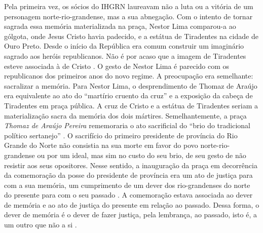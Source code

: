 \begin{refsection}
    Pela primeira vez, os sócios do IHGRN laureavam não a luta ou a vitória de um personagem norte-rio-grandense, mas a sua abnegação. Com o intento de tornar sagrada essa memória materializada na praça, Nestor Lima comparou-a ao gólgota, onde Jesus Cristo havia padecido, e a estátua de Tiradentes na cidade de Ouro Preto. Desde o início da República era comum construir um imaginário sagrado aos heróis republicanos. Não é por acaso que a imagem de Tiradentes esteve associada à de Cristo \cite{Carvalho1990Formacao}. O gesto de Nestor Lima é parecido com os republicanos dos primeiros anos do novo regime. A preocupação era semelhante: sacralizar a memória. Para Nestor Lima, o desprendimento de Thomaz de Araújo era equivalente ao ato do ``martírio cruento da cruz'' e a exposição da cabeça de Tiradentes em praça pública. A cruz de Cristo e a estátua de Tiradentes seriam a materialização sacra da memória dos dois mártires. Semelhantemente, a praça \textit{Thomaz de Araújo Pereira} rememoraria o ato sacrificial do ``brio do tradicional político sertanejo'' \cite[p.~533]{Lyra1921Historia}. O sacrifício do primeiro presidente de província do Rio Grande do Norte não consistia na sua morte em favor do povo norte-rio-grandense ou por um ideal, mas sim no custo do seu brio, de seu gesto de não resistir aos seus opositores. Nesse sentido, a inauguração da praça em decorrência da comemoração da posse do presidente de província era um ato de justiça para com a sua memória, um cumprimento de um dever dos rio-grandenses do norte do presente para com o seu passado \cite[p.~533]{Lyra1921Historia}. A comemoração estava associada ao dever de memória e ao ato de justiça do presente em relação ao passado. Dessa forma, o dever de memória é o dever de fazer justiça, pela lembrança, ao passado, isto é, a um outro que não a si \cite[p.~101]{Ricoeur2007Memoria}.


\end{refsection}
